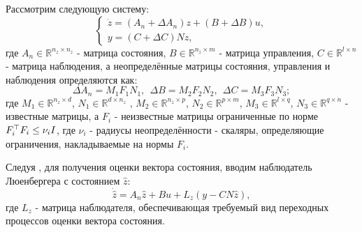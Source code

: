Рассмотрим следующую систему: 
%
\begin{equation}
	\label{eq:part2_linear_dynamics}
	\begin{cases}
		\dot z=({A}_n+\Delta {A}_n)z + ({B}+\Delta {B})u,\\
		y = ({C}+ \Delta {C}){N}  z,
	\end{cases}
\end{equation}
%
где $A_n \in \mathbb{R}^{n_z \times n_z}$ - матрица состояния, $B \in \mathbb{R}^{n_z \times m}$ - матрица управления, $C \in \mathbb{R}^{l \times n}$ - матрица наблюдения, а неопределённые матрицы состояния, управления и наблюдения определяются как:
%
\begin{equation}
	\label{eq:part2_uncertainty}
	\Delta {A}_n={M}_1{F}_1{N}_1, \ \ \Delta {B}= {M}_2{F}_2{N}_2, \ \
	\Delta {C} = {M}_3{F}_3{N}_3; 
\end{equation}
%
где ${M}_1 \in \mathbb{R}^{n_z \times d}$, 
${N}_1 \in \mathbb{R}^{d \times n_z}$ , ${M}_2 \in \mathbb{R}^{n_z \times p}$,
${N}_2 \in \mathbb{R}^{p \times m}$, ${M}_3 \in \mathbb{R}^{l \times q}$,
${N}_3 \in \mathbb{R}^{q \times n}$ - известные матрицы, 
а ${F}_i$ - неизвестные матрицы ограниченные по норме ${F}_i^\top{F}_i\leq \nu_i {I}$, где $\nu_i$ - радиусы неопределённости - скаляры, определяющие ограничения, накладываемые на нормы ${F}_i$. 

Следуя \cite{SAVIN2021}, для получения оценки вектора состояния, вводим наблюдатель Люенбергера с состоянием $\hat{z}$:
%
\begin{equation}
	\label{eq:Luenberger}
	\dot{\hat{z}}={A}_n\hat{z}+{B}u+{L}_z(y- {C} {N}\hat{z}),
\end{equation}
%
где ${L}_z$ - матрица наблюдателя, обеспечивающая требуемый вид переходных процессов оценки вектора состояния. 
 

